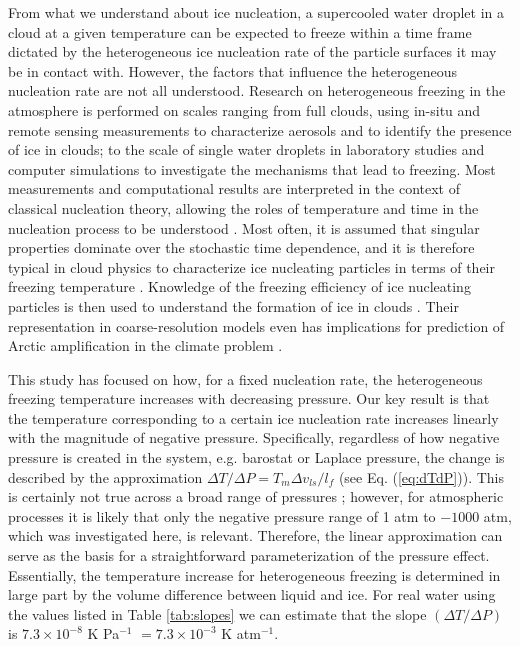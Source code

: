 \documentclass[journal abbreviation, manuscript]{copernicus}
\begin{document}
From what we understand about ice nucleation, a supercooled water droplet in a cloud at a given temperature can be expected to freeze within a time frame dictated by the heterogeneous ice nucleation rate of the particle surfaces it may be in contact with. However, the factors that influence the heterogeneous nucleation rate are not all understood. Research on heterogeneous freezing in the atmosphere is performed on scales ranging from full clouds, using in-situ and remote sensing measurements to characterize aerosols and to identify the presence of ice in clouds; to the scale of single water droplets in laboratory studies and computer simulations to investigate the mechanisms that lead to freezing. Most measurements and computational results are interpreted in the context of classical nucleation theory, allowing the roles of temperature and time in the nucleation process to be understood \citep[e.g.,][]{niedermeier2011heterogeneous}. Most often, it is assumed that singular properties dominate over the stochastic time dependence, and it is therefore typical in cloud physics to characterize ice nucleating particles in terms of their freezing temperature \citep[e.g.,][]{hoose2012heterogeneous,frostenberg2022chance}. Knowledge of the freezing efficiency of ice nucleating particles is then used to understand the formation of ice in clouds \citep[e.g.,][]{yang2013minimalist,fu2017effect}. Their representation in coarse-resolution models even has implications for prediction of Arctic amplification in the climate problem \citep{tan2022potential}. 

This study has focused on how, for a fixed nucleation rate, the heterogeneous freezing temperature increases with decreasing pressure. Our key result is that the temperature corresponding to a certain ice nucleation rate increases linearly with the magnitude of negative pressure. Specifically, regardless of how negative pressure is created in the system, e.g. barostat or Laplace pressure, the change is described by the approximation $\Delta T/\Delta P = T_m \Delta v_{ls} / l_f$ (see Eq. (\ref{eq:dTdP})). This is certainly not true across a broad range of pressures \citep[e.g.,][]{bianco2021, espinosa2016}; however, for atmospheric processes it is likely that only the negative pressure range of 1 atm to $-1000$ atm, which was investigated here, is relevant. Therefore, the linear approximation can serve as the basis for a straightforward parameterization of the pressure effect. Essentially, the temperature increase for heterogeneous freezing is determined in large part by the volume difference between liquid and ice. For real water using the values listed in Table \ref{tab:slopes} we can estimate that the slope $(\Delta T/\Delta P)$ is $7.3 \times 10^{-8}$ K Pa$^{-1}$ $= 7.3 \times 10^{-3}$ K atm$^{-1}$. 
\end{document}
